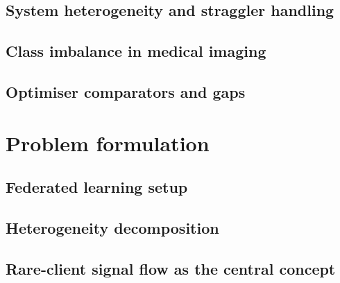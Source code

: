 \documentclass[11pt,a4paper]{report}
\begin{document}
\section{System heterogeneity and straggler handling}
\label{sec:bg-system-het}

\section{Class imbalance in medical imaging}
\label{sec:bg-imbalance}

\section{Optimiser comparators and gaps}
\label{sec:bg-gaps}


\chapter{Problem formulation}
\label{ch:problem}


\section{Federated learning setup}
\label{sec:prob-fl-setup}

\section{Heterogeneity decomposition}
\label{sec:prob-het-decomp}

\section{Rare-client signal flow as the central concept}
\label{sec:prob-signal-flow}
\end{document}
